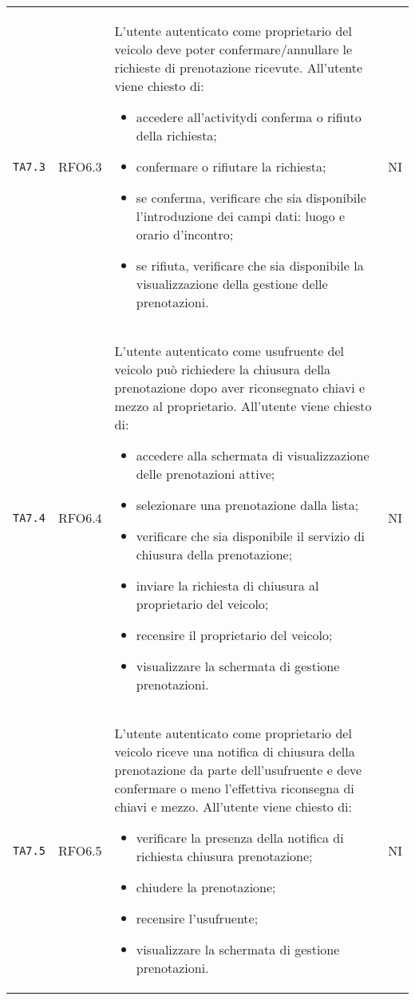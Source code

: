 \begin{longtable}{ >{\centering}p{} >{\centering}p{} >{\centering}p{}
			>{\centering}p{}}
	 	\texttt{TA7.3} & RFO6.3 & L'utente autenticato come proprietario del veicolo deve poter confermare/annullare le richieste di prenotazione ricevute. All'utente viene chiesto di:
	 	\begin{itemize}
	 		\item accedere all'activity\glosp di conferma o rifiuto della richiesta;
	 		\item confermare o rifiutare la richiesta;
	 		\item se conferma, verificare che sia disponibile l'introduzione dei campi dati: luogo e orario d'incontro;
	 		\item se rifiuta, verificare che sia disponibile la visualizzazione della gestione delle prenotazioni.
	 	\end{itemize}	&	NI	\tabularnewline
 		\texttt{TA7.4} &	RFO6.4 &	L'utente autenticato come usufruente del veicolo può richiedere la chiusura della prenotazione dopo aver riconsegnato chiavi e mezzo al proprietario. All'utente viene chiesto di:
 		\begin{itemize}
 			\item accedere alla schermata di visualizzazione delle prenotazioni attive;
 			\item selezionare una prenotazione dalla lista;
 			\item verificare che sia disponibile il servizio di chiusura della prenotazione;
 			\item inviare la richiesta di chiusura al proprietario del veicolo;
 			\item recensire il proprietario del veicolo;
 			\item visualizzare la schermata di gestione prenotazioni.
 		\end{itemize}	&	NI	\tabularnewline
 		\texttt{TA7.5} & RFO6.5 &	L'utente autenticato come proprietario del veicolo riceve una notifica di chiusura della prenotazione da parte dell'usufruente e deve confermare o meno l'effettiva riconsegna di chiavi e mezzo. All'utente viene chiesto di:
 		\begin{itemize}
 			\item verificare la presenza della notifica di richiesta chiusura prenotazione;
 			\item chiudere la prenotazione;
 			\item recensire l'usufruente;
 			\item visualizzare la schermata di gestione prenotazioni.	
 		\end{itemize}	&	NI	\tabularnewline
 				

\end{longtable}

